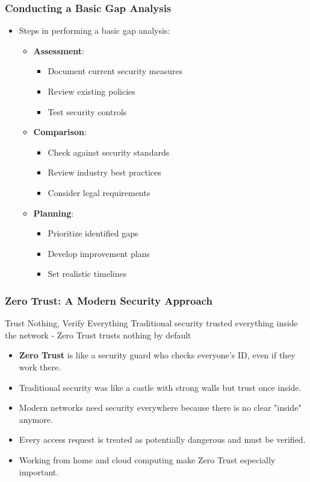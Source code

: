 \documentclass{beamer}
\begin{document}
\begin{frame}
    \frametitle{Conducting a Basic Gap Analysis}
    \begin{itemize}
        \item Steps in performing a basic gap analysis:
            \begin{itemize}
                \item \textbf{Assessment}:
                    \begin{itemize}
                        \item Document current security measures
                        \item Review existing policies
                        \item Test security controls
                    \end{itemize}
                \item \textbf{Comparison}:
                    \begin{itemize}
                        \item Check against security standards
                        \item Review industry best practices
                        \item Consider legal requirements
                    \end{itemize}
                \item \textbf{Planning}:
                    \begin{itemize}
                        \item Prioritize identified gaps
                        \item Develop improvement plans
                        \item Set realistic timelines
                    \end{itemize}
            \end{itemize}
    \end{itemize}
\end{frame}

\begin{frame}
    \frametitle{Zero Trust: A Modern Security Approach}
    \begin{block}{Trust Nothing, Verify Everything}
        Traditional security trusted everything inside the network - Zero Trust trusts nothing by default
    \end{block}
    \begin{itemize}
        \item \textbf{Zero Trust} is like a security guard who checks everyone's ID, even if they work there.
        \item Traditional security was like a castle with strong walls but trust once inside.
        \item Modern networks need security everywhere because there is no clear "inside" anymore.
        \item Every access request is treated as potentially dangerous and must be verified.
        \item Working from home and cloud computing make Zero Trust especially important.
    \end{itemize}
\end{frame}
\end{document}
